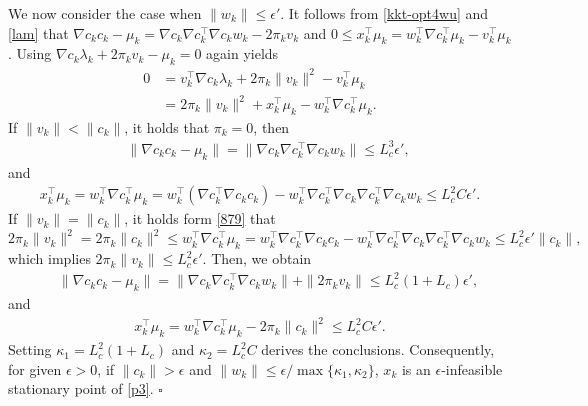 \documentclass[11pt]{article}
\newenvironment{proof}{{\noindent\it Proof.}\quad}{\hfill $\square$\par}
\newcommand{\be}{\begin{equation}}
\newcommand{\ee}{\end{equation}}
\begin{document}
\begin{proof}
    We now consider the case when  \(\|w_k\|\leq \epsilon'\). It follows from \eqref{kkt-opt4wu} and \eqref{lam} that \(\nabla c_k c_k - \mu_k = \nabla c_k \nabla c_k^\top \nabla c_k w_k - 2\pi_k v_k\) and \(0 \leq x_k^\top \mu_k = w_k^\top \nabla c_k^\top \mu_k - v_k^\top \mu_k\).
    Using \(\nabla c_k \lambda_k + 2\pi_k v_k - \mu_k = 0\) again yields
    \be\begin{aligned}\label{879}
    0 &= v_k^\top \nabla c_k \lambda_k + 2\pi_k \|v_k\|^2 - v_k^\top \mu_k \\
    &=2\pi_k \|v_k\|^2 + x_k^\top \mu_k - w_k^\top \nabla c_k^\top \mu_k.
    \end{aligned}\ee
    If \(\|v_k\| < \|c_k\|\), it holds that  \(\pi_k = 0\), then
    \begin{align*}
        \quad ~\|\nabla c_k c_k - \mu_k\| = \|\nabla c_k \nabla c_k^\top \nabla c_k w_k\| 
        \leq L_c^3\epsilon',
    \end{align*}
    and
    \begin{align*}
        x_k^\top \mu_k = w_k^\top \nabla c_k^\top \mu_k = w_k^\top(\nabla c_k^\top \nabla c_k c_k) - w_k^\top \nabla c_k^\top \nabla c_k \nabla c_k^\top \nabla c_k w_k \leq L_c^2 C\epsilon'.
    \end{align*}
    If \(\|v_k\| = \|c_k\|\), it holds form \eqref{879} that
    \[
    2\pi_k\|v_k\|^2= 2\pi_k \|c_k\|^2 \leq w_k^\top \nabla c_k^\top \mu_k = w_k^\top \nabla c_k^\top \nabla c_k c_k - w_k^\top \nabla c_k^\top \nabla c_k \nabla c_k^\top \nabla c_k w_k \leq L_c^2 \epsilon' \|c_k\|,
    \]
    which implies \(2\pi_k\| v_k\| \leq L_c^2 \epsilon'\). Then, we obtain
    \begin{align*}
        \quad ~\|\nabla c_k c_k - \mu_k\| = \|\nabla c_k \nabla c_k^\top \nabla c_k w_k\| + \|2 \pi_k v_k\|
        \leq L_c^2(1+L_c)\epsilon',
    \end{align*}
    and
    \begin{align*}
        x_k^\top \mu_k = {w_k^\top \nabla c_k^\top \mu_k - 2\pi_k \|c_k\|^2 \le L_c^2 C\epsilon'.}
    \end{align*}
    Setting \(\kappa_1 = L_c^2(1+L_c)\) and \(\kappa_2 =  L_c^2 C\) derives the conclusions. Consequently, for given $\epsilon>0$, if $\|c_k\|>\epsilon$ and $\|w_k\|\le \epsilon/\max\{\kappa_1,\kappa_2\}$, $x_k$ is an $\epsilon$-infeasible stationary point of \eqref{p3}.
\end{proof}
\end{document}
